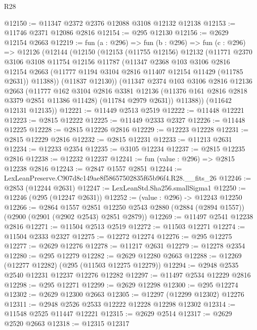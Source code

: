 \begin{lexlean}{R28}
\begin{coremodule}
@12150 := @11347 @2372 @2376 @12088 @3108 @12132 @12138
@12153 := @11746 @2371 @12086 @2816
@12154 := @295 @12130
@12156 := @2629 @12154 @2663
@12219 := fun (a : @296) =>
  fun (b : @296) =>
  fun (c : @296) =>
  @12126
    (@12144
      (@12150
        (@12153
          (@11755 @12156)
          @12132
          (@11771
            @2370
            @3106
            @3108
            @11754
            @12156
            @11787
            (@11347
              @2368
              @103
              @3106
              @2816
              @12154
              @2663
              (@11777 @1194 @3104 @2816 @11407 @12154 @11429 (@11785 @2631))
              @11388))
          (@11837 @12130))
        (@11347
          @2374
          @103
          @3106
          @2816
          @12136
          @2663
          (@11777
            @162
            @3104
            @2816
            @3381
            @12136
            (@11376 @161 @2816 @2818 @3379 @2851 @11386 @11428)
            (@11784 @2979 @2631))
          @11388))
      (@11642 @12131 @12135))
@12221 := @11449 @2513 @2519
@12222 := @11448 @12221
@12223 := @2815 @12222
@12225 := @11449 @2333 @2327
@12226 := @11448 @12225
@12228 := @2815 @12226 @2816
@12229 := @12223 @12228
@12231 := @2815 @12229 @2816
@12232 := @2815 @12231
@12233 := @11213 @2631
@12234 := @12233 @2354
@12235 := @3105 @12234
@12237 := @2815 @12235 @2816
@12238 := @12232 @12237
@12241 := fun (value : @296) => @2815 @12238 @2816
@12243 := @2847 @1557 @2851
@12244 := LexLeanPreserve.C907d8c149ae8f58657502835f65b96f4.R28.__fits_26
@12246 := @2853 (@12244 @2631)
@12247 := LexLeanStd.Sha256.smallSigma1
@12250 := @12246 (@295 (@12247 @2631))
@12252 := (value : @296) -> @12243 @12250
@12266 := @2864
    @1557
    @2851
    @12250
    @2543
    @2880
    (@2884 (@2894 @1557))
    (@2900 (@2901 (@2902 @2543) @2851 @2879))
@12269 := @11497 @2541 @12238 @2816
@12271 := @11504 @2513 @2519
@12272 := @11503 @12271
@12274 := @11504 @2333 @2327
@12275 := @12272 @12274
@12276 := @295 @12275
@12277 := @2629 @12276
@12278 := @11217 @2631
@12279 := @12278 @2354
@12280 := @295 @12279
@12282 := @2629 @12280 @2663
@12288 := @12269 (@12277 @12282) (@295 (@11503 @12275 @12279))
@12294 := @2948 @2535 @2540 @12231 @12237 @12276 @12282
@12297 := @11497 @2534 @12229 @2816
@12298 := @295 @12271
@12299 := @2629 @12298
@12300 := @295 @12274
@12302 := @2629 @12300 @2663
@12305 := @12297 (@12299 @12302) @12276
@12311 := @2948 @2526 @2533 @12222 @12228 @12298 @12302
@12314 := @11548 @2525 @11447 @12221
@12315 := @2629 @2514
@12317 := @2629 @2520 @2663
@12318 := @12315 @12317

\end{coremodule}
\end{lexlean}
